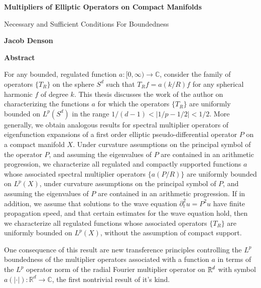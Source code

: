 
\fancyhf{} %
\fancyhead[RO,R]{\thepage} %
\renewcommand{\headrulewidth}{0pt}

\begin{center}
    \Large
    \textbf{Multipliers of Elliptic Operators on Compact Manifolds}
    
    \vspace{0.4cm}
    \large
    Necessary and Sufficient Conditions For Boundedness
    
    \vspace{0.4cm}
    \textbf{Jacob Denson}
    
    \vspace{0.9cm}
    \textbf{Abstract}
\end{center}

For any bounded, regulated function $a: [0,\infty) \to \mathbb{C}$, consider the family of operators $\{ T_R \}$ on the sphere $S^d$ such that $T_R f = a(k/R) f$ for any spherical harmonic $f$ of degree $k$. This thesis discusses the work of the author on characterizing the functions $a$ for which the operators $\{ T_R \}$ are uniformly bounded on $L^p(S^d)$ in the range $1/(d-1) < |1/p - 1/2| < 1/2$. More generally, we obtain analogous results for spectral multiplier operators of eigenfunction expansions of a first order elliptic pseudo-differential operator $P$ on a compact manifold $X$. Under curvature assumptions on the principal symbol of the operator $P$, and assuming the eigenvalues of $P$ are contained in an arithmetic progression, we characterize all regulated and compactly supported functions $a$ whose associated spectral multiplier operators $\{ a(P/R) \}$ are uniformly bounded on $L^p(X)$, under curvature assumptions on the principal symbol of $P$, and assuming the eigenvalues of $P$ are contained in an arithmetic progression. If in addition, we assume that solutions to the wave equation $\partial_t^2 u = P^2 u$ have finite propagation speed, and that certain estimates for the wave equation hold, then we characterize all regulated functions whose associated operators $\{ T_R \}$ are uniformly bounded on $L^p(X)$, without the assumption of compact support.

One consequence of this result are new transference principles controlling the $L^p$ boundedness of the multiplier operators associated with a function $a$ in terms of the $L^p$ operator norm of the radial Fourier multiplier operator on $\operatorname{\mathbb{R}}^d$ with symbol $a(|\cdot|): \mathbb{R}^d \to \mathbb{C}$, the first nontrivial result of it's kind.

